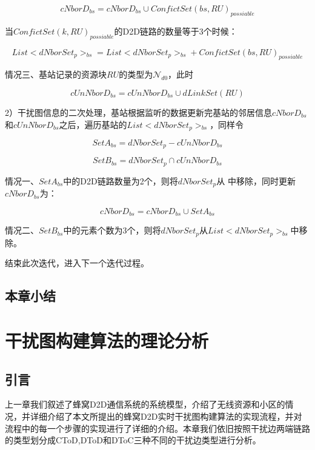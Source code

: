 \documentclass[figurelist,tablelist,algorithmlist,nomlist,masters]{seuthesix}
\begin{document}
	\begin{equation}\label{eq2.24}
	cNborD_{bs} = cNborD_{bs} \cup ConfictSet{(bs,RU)_{possiable}}
	\end{equation}

	当$ConfictSet{(k,RU)_{possiable}}$的D2D链路的数量等于3个时候：

	\begin{equation}\label{eq2.25}
	List < dNborSet_{p}{ > _{bs}} = List < dNborSet_{p}{ > _{bs}} + ConfictSet{(bs,RU)_{possiable}}
	\end{equation}


	情况三、基站记录的资源块$RU$的类型为$\mathcal{N}_{d0}$，此时

	\begin{equation}\label{eq2.26}
	cUnNborD_{bs} = cUnNborD_{bs} \cup dLinkSet(RU)
	\end{equation}


	2）干扰图信息的二次处理，基站根据监听的数据更新完基站的邻居信息$cNborD_{bs}$和$cUnNborD_{bs}$之后，遍历基站的$List < dNborSet_{p}{ > _{bs}}$，同样令

	\begin{equation}\label{eq2.27}
	Set{A_{bs}} = dNborSet_{p} - cUnNborD_{bs}
	\end{equation}

	\begin{equation}\label{eq2.28}
	Set{B_{bs}} = dNborSet_{p} \cap cUnNborD_{bs}
	\end{equation}

	情况一、$Set{A_{bs}}$中的D2D链路数量为2个，则将$dNborSet_{p}$从 中移除，同时更新$cNborD_{bs}$为：

	\begin{equation}\label{eq2.29}
	cNborD_{bs} = cNborD_{bs} \cup Set{A_{bs}}
	\end{equation}

	情况二、$Set{B_{bs}}$中的元素个数为3个，则将$dNborSet_{p}$从$List < dNborSet_{p}{ > _{bs}}$中移除。

	结束此次迭代，进入下一个迭代过程。

	\section{本章小结}


	\chapter{干扰图构建算法的理论分析}
	\section{引言}
	上一章我们叙述了蜂窝D2D通信系统的系统模型，介绍了无线资源和小区的情况，并详细介绍了本文所提出的蜂窝D2D实时干扰图构建算法的实现流程，并对流程中的每一个步骤的实现进行了详细的介绍。本章我们依旧按照干扰边两端链路的类型划分成CToD,DToD和DToC三种不同的干扰边类型进行分析。
\end{document}
